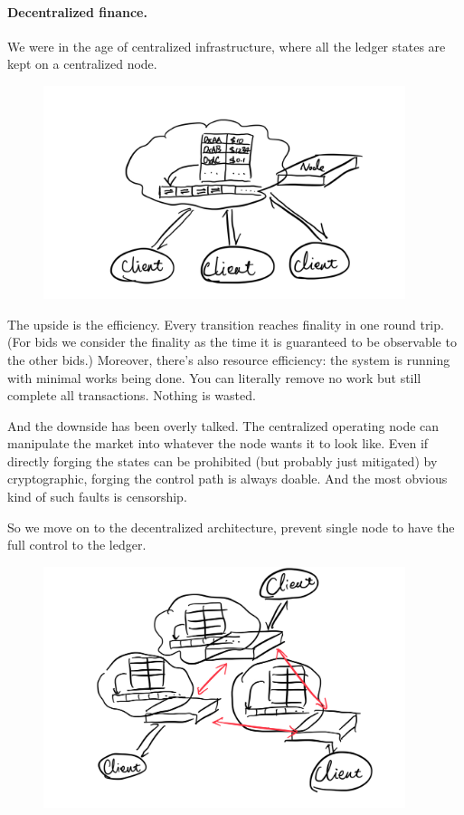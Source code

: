 \paragraph{Decentralized finance.}
We were in the age of centralized infrastructure, where all the ledger states are kept on a centralized node.

\begin{figure}[H]
    \includegraphics[width=300pt]{graphs/IMG_0050}
    \Description{}
\end{figure}

The upside is the efficiency. Every transition reaches finality in one round trip.
(For bids we consider the finality as the time it is guaranteed to be observable to the other bids.)
Moreover, there's also resource efficiency: the system is running with minimal works being done.
You can literally remove no work but still complete all transactions.
Nothing is wasted.

And the downside has been overly talked.
The centralized operating node can manipulate the market into whatever the node wants it to look like.
Even if directly forging the states can be prohibited (but probably just mitigated) by cryptographic, forging the control path is always doable.
And the most obvious kind of such faults is censorship.

So we move on to the decentralized architecture, prevent single node to have the full control to the ledger.

\begin{figure}[H]
    \includegraphics[width=300pt]{graphs/IMG_0051}
    \Description{}
\end{figure}

